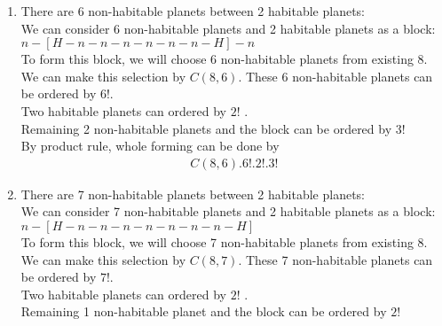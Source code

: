 \documentclass[11pt]{article}
\begin{document}
    \begin{enumerate}
        \item There are 6 non-habitable planets between 2 habitable planets:\\
            \hspace*{5mm} We can consider 6 non-habitable planets and 2 habitable planets as a block:\\
            \hspace*{10mm} $n-[H-n-n-n-n-n-n-H]-n$\\
            \hspace*{5mm} To form this block, we will choose 6 non-habitable planets from existing 8. \\
            \hspace*{5mm} We can make this selection by $C(8,6)$. These 6 non-habitable planets can be ordered by $6!$.\\
            \hspace*{5mm} Two habitable planets can ordered by $2!$ .\\
            \hspace*{5mm} Remaining 2 non-habitable planets and the block can be ordered by $3!$\\
            \hspace*{5mm} By product rule, whole forming can be done by
            \begin{gather*}
                C(8,6).6!.2!.3!
            \end{gather*}
        \item There are 7 non-habitable planets between 2 habitable planets: \\
            \hspace*{5mm} We can consider 7 non-habitable planets and 2 habitable planets as a block:\\
            \hspace*{10mm} $n-[H-n-n-n-n-n-n-n-H]$\\
            \hspace*{5mm} To form this block, we will choose 7 non-habitable planets from existing 8. \\
            \hspace*{5mm} We can make this selection by $C(8,7)$. These 7 non-habitable planets can be ordered by $7!$.\\
            \hspace*{5mm} Two habitable planets can ordered by $2!$ .\\
            \hspace*{5mm} Remaining 1 non-habitable planet and the block can be ordered by $2!$\\

\end{enumerate}
\end{document}
